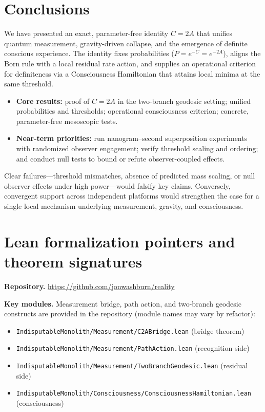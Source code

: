 \documentclass[reprint,aps,prd,nofootinbib]{revtex4-2}
\begin{document}
\section{Conclusions}
\label{sec:conclusions}

We have presented an exact, parameter-free identity $C=2A$ that unifies quantum measurement, gravity-driven collapse, and the emergence of definite conscious experience. The identity fixes probabilities ($P=e^{-C}=e^{-2A}$), aligns the Born rule with a local residual rate action, and supplies an operational criterion for definiteness via a Consciousness Hamiltonian that attains local minima at the same threshold.

\begin{itemize}
  \item \textbf{Core results:} proof of $C=2A$ in the two-branch geodesic setting; unified probabilities and thresholds; operational consciousness criterion; concrete, parameter-free mesoscopic tests.
  \item \textbf{Near-term priorities:} run nanogram--second superposition experiments with randomized observer engagement; verify threshold scaling and ordering; and conduct null tests to bound or refute observer-coupled effects.
\end{itemize}

Clear failures---threshold mismatches, absence of predicted mass scaling, or null observer effects under high power---would falsify key claims. Conversely, convergent support across independent platforms would strengthen the case for a single local mechanism underlying measurement, gravity, and consciousness.

\appendix

\section{Lean formalization pointers and theorem signatures}
\noindent\textbf{Repository.} \url{https://github.com/jonwashburn/reality}

\noindent\textbf{Key modules.} Measurement bridge, path action, and two-branch geodesic constructs are provided in the repository (module names may vary by refactor):
\begin{itemize}
  \item \texttt{IndisputableMonolith/Measurement/C2ABridge.lean} (bridge theorem)
  \item \texttt{IndisputableMonolith/Measurement/PathAction.lean} (recognition side)
  \item \texttt{IndisputableMonolith/Measurement/TwoBranchGeodesic.lean} (residual side)
  \item \texttt{IndisputableMonolith/Consciousness/ConsciousnessHamiltonian.lean} (consciousness)
\end{itemize}
\end{document}
